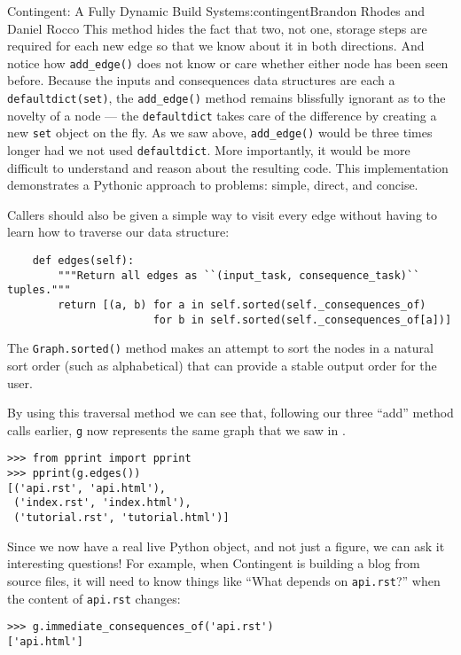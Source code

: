 \begin{aosachapter}{Contingent: A Fully Dynamic Build System}{s:contingent}{Brandon Rhodes and Daniel Rocco}
This method hides the fact that two, not one, storage steps are required
for each new edge so that we know about it in both directions. And
notice how \texttt{add\_edge()} does not know or care whether either
node has been seen before. Because the inputs and consequences data
structures are each a \texttt{defaultdict(set)}, the
\texttt{add\_edge()} method remains blissfully ignorant as to the
novelty of a node --- the \texttt{defaultdict} takes care of the
difference by creating a new \texttt{set} object on the fly. As we saw
above, \texttt{add\_edge()} would be three times longer had we not used
\texttt{defaultdict}. More importantly, it would be more difficult to
understand and reason about the resulting code. This implementation
demonstrates a Pythonic approach to problems: simple, direct, and
concise.

Callers should also be given a simple way to visit every edge without
having to learn how to traverse our data structure:

\begin{verbatim}
    def edges(self):
        """Return all edges as ``(input_task, consequence_task)`` tuples."""
        return [(a, b) for a in self.sorted(self._consequences_of)
                       for b in self.sorted(self._consequences_of[a])]
\end{verbatim}

The \texttt{Graph.sorted()} method makes an attempt to sort the nodes in
a natural sort order (such as alphabetical) that can provide a stable
output order for the user.

By using this traversal method we can see that, following our three
``add'' method calls earlier, \texttt{g} now represents the same graph
that we saw in .

\begin{verbatim}
>>> from pprint import pprint
>>> pprint(g.edges())
[('api.rst', 'api.html'),
 ('index.rst', 'index.html'),
 ('tutorial.rst', 'tutorial.html')]
\end{verbatim}

Since we now have a real live Python object, and not just a figure, we
can ask it interesting questions! For example, when Contingent is
building a blog from source files, it will need to know things like
``What depends on \texttt{api.rst}?'' when the content of
\texttt{api.rst} changes:

\begin{verbatim}
>>> g.immediate_consequences_of('api.rst')
['api.html']
\end{verbatim}


\end{aosachapter}
